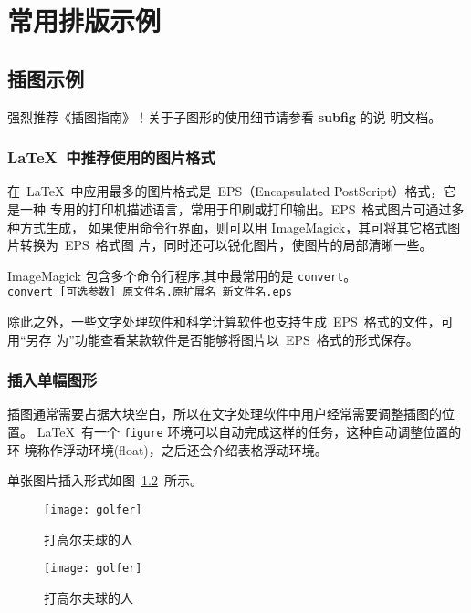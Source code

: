 \chapter{常用排版示例}
\label{cha:example}

\section{插图示例}
\label{sec:figure}

强烈推荐《\LaTeXe 插图指南》！关于子图形的使用细节请参看 \textbf{subfig} 的说
明文档。

\subsection{\LaTeX~中推荐使用的图片格式}

在~\LaTeX~中应用最多的图片格式是~EPS（Encapsulated PostScript）格式，它是一种
专用的打印机描述语言，常用于印刷或打印输出。EPS~格式图片可通过多种方式生成，
如果使用命令行界面，则可以用 ImageMagick，其可将其它格式图片转换为~EPS~格式图
片，同时还可以锐化图片，使图片的局部清晰一些。

ImageMagick 包含多个命令行程序,其中最常用的是 \texttt{convert}。\\
\verb|convert [可选参数] 原文件名.原扩展名 新文件名.eps|

除此之外，一些文字处理软件和科学计算软件也支持生成~EPS~格式的文件，可用“另存
为”功能查看某款软件是否能够将图片以~EPS~格式的形式保存。

\subsection{插入单幅图形}

插图通常需要占据大块空白，所以在文字处理软件中用户经常需要调整插图的位置。
\LaTeX~有一个 \texttt{figure} 环境可以自动完成这样的任务，这种自动调整位置的环
境称作浮动环境(float)，之后还会介绍表格浮动环境。

单张图片插入形式如图~\ref{fig:golfer}~所示。
\begin{figure}[htbp]
\centering
\texttt{[image: golfer]}
\caption{打高尔夫球的人}
\label{fig:golfer}
\end{figure}

\begin{code}
\begin{figure}[htbp]
\centering
\texttt{[image: golfer]}
\caption{打高尔夫球的人}
\label{fig:golfer}
\end{figure}
\end{code}

